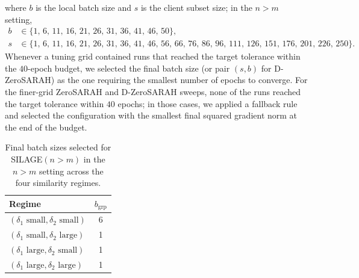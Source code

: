 \documentclass{article}
\theoremstyle{plain}
\newcommand{\algname}[1]{{\sf\scalefont{0.88}\color{mydarkgreen}#1}\xspace}
\def\algname#1{#1}%
\begin{document}
where $b$ is the local batch size and $s$ is the client subset size; in the $n>m$ setting,
\begin{equation*}
\begin{aligned}
b &\in \{1,\, 6,\, 11,\, 16,\, 21,\, 26,\, 31,\, 36,\, 41,\, 46,\, 50\}, \\
s &\in \{1,\, 6,\, 11,\, 16,\, 21,\, 26,\, 31,\, 36,\, 41,\, 46,\, 56,\, 66,\, 76,\, 86,\, 96,\, 111,\, 126,\, 151,\, 176,\, 201,\, 226,\, 250\}.
\end{aligned}
\end{equation*}
Whenever a tuning grid contained runs that reached the target tolerance within the $40$-epoch budget, we selected the final batch size (or pair $(s,b)$ for \algname{D-ZeroSARAH}) as the one requiring the smallest number of epochs to converge. For the finer-grid \algname{ZeroSARAH} and \algname{D-ZeroSARAH} sweeps, none of the runs reached the target tolerance within $40$ epochs; in those cases, we applied a fallback rule and selected the configuration with the smallest final squared gradient norm at the end of the budget.

\begin{table}[t]
\centering
\small
\setlength{\tabcolsep}{5pt}
\caption{Final batch sizes selected for \algname{SILAGE}$(n>m)$ in the $n>m$ setting across the four similarity regimes.}
\begin{tabular}{lc}
\toprule
\textbf{Regime} & $b_{\mathrm{grp}}$ \\
\midrule
$(\delta_1 \text{ small}, \delta_2 \text{ small})$ & 6 \\
$(\delta_1 \text{ small}, \delta_2 \text{ large})$ & 1 \\
$(\delta_1 \text{ large}, \delta_2 \text{ small})$ & 1 \\
$(\delta_1 \text{ large}, \delta_2 \text{ large})$ & 1 \\
\bottomrule
\end{tabular}
\end{table}
\end{document}
